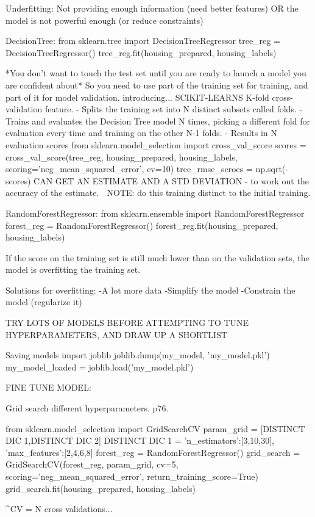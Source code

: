Underfitting:
Not providing enough information (need better features)
OR
the model is not powerful enough (or reduce constraints)

DecisionTree:
from sklearn.tree import DecisionTreeRegressor
tree_reg = DecisionTreeRegressor()
tree_reg.fit(housing_prepared, housing_labels)

*You don't want to touch the test set until you are ready to launch a model you are confident about*
So you need to use part of the training set for training, and part of it for model validation.
introducing...
SCIKIT-LEARNS K-fold cross-validation feature.
- Splits the training set into N distinct subsets called folds.
- Trains and evaluates the Decision Tree model N times, picking a different fold for evaluation every time and training on the other N-1 folds.
- Results in N evaluation scores
from sklearn.model_selection import cross_val_score
scores = cross_val_score(tree_reg, housing_prepared, housing_labels, scoring='neg_mean_squared_error', cv=10)
tree_rmse_scroes = np.sqrt(-scores)
CAN GET AN ESTIMATE AND A STD DEVIATION - to work out the accuracy of the estimate.
^^^
NOTE: do this training distinct to the initial training.


RandomForestRegressor:
from sklearn.ensemble import RandomForestRegressor
forest_reg = RandomForestRegressor()
forest_reg.fit(housing_prepared, housing_labels)

If the score on the training set is still much lower than on the validation sets,
the model is overfitting the training set.

Solutions for overfitting:
-A lot more data
-Simplify the model
-Constrain the model (regularize it)

TRY LOTS OF MODELS BEFORE ATTEMPTING TO TUNE HYPERPARAMETERS,
AND DRAW UP A SHORTLIST

Saving models
import joblib
joblib.dump(my_model, 'my_model.pkl')
my_model_loaded = joblib.load('my_model.pkl')

FINE TUNE MODEL:

Grid search different hyperparameters. p76.

from sklearn.model_selection import GridSearchCV
param_grid = [{DISTINCT DIC 1},{DISTINCT DIC 2}]
DISTINCT DIC 1 = {'n_estimators':[3,10,30], 'max_features':[2,4,6,8]}
forest_reg = RandomForestRegressor()
grid_search = GridSearchCV(forest_reg, param_grid, cv=5, scoring='neg_mean_squared_error', return_training_score=True)
grid_search.fit(housing_prepared, housing_labels)

^CV = N cross validations...

